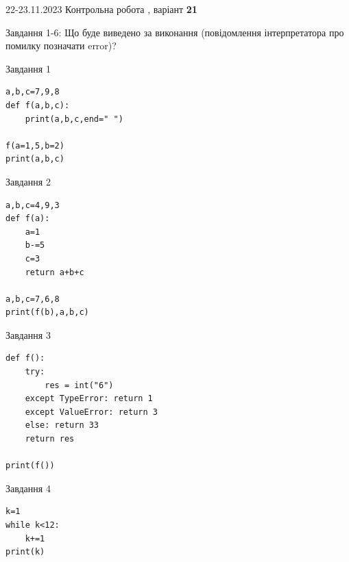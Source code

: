 \documentclass[12pt, ukrainian]{article}
\begin{document}
{{22-23.11.2023 Контрольна робота , варіант  \No \textbf { 21 }\par}}
{

Завдання 1-6: Що буде виведено за виконання (повідомлення інтерпретатора про помилку позначати error)?


\begin{minipage}[t]{9.7cm}                
{\begin{center}Завдання {1}\end{center}}
\begin{verbatim}
a,b,c=7,9,8
def f(a,b,c):
    print(a,b,c,end=" ")

f(a=1,5,b=2)
print(a,b,c)
\end{verbatim}     
\end{minipage}
\vline \hspace{8mm}
\begin{minipage}[t]{8.0cm}                
{\begin{center}Завдання {2}\end{center}}
\begin{verbatim}
a,b,c=4,9,3
def f(a):
    a=1
    b-=5
    c=3
    return a+b+c

a,b,c=7,6,8
print(f(b),a,b,c)
\end{verbatim}     
\end{minipage}

\vspace{15mm}
\begin{minipage}[t]{9.7cm}                
{\begin{center}Завдання {3}\end{center}}
\begin{verbatim}
def f():
    try:
        res = int("6")
    except TypeError: return 1
    except ValueError: return 3
    else: return 33
    return res

print(f())
\end{verbatim}     
\end{minipage}
\vline \hspace{8mm}
\begin{minipage}[t]{8.0cm}                
{\begin{center}Завдання {4}\end{center}}
\begin{verbatim}
k=1
while k<12:
    k+=1
print(k)
\end{verbatim}     
\end{minipage}

}
\end{document}
